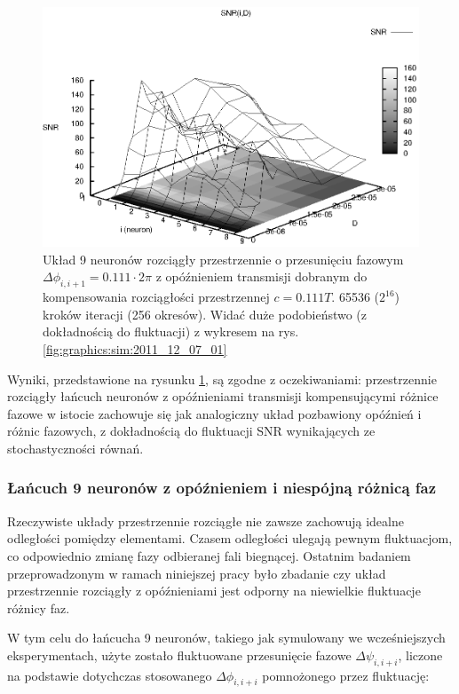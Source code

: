   \begin{figure}
    \includegraphics[width=140mm]{images/9neuron/2011_12_07_04}
    \caption{Układ 9 neuronów rozciągły przestrzennie o przesunięciu fazowym $\Delta \phi_{i,i+1} = 0.111 \cdot 2 \pi$ z opóźnieniem transmisji dobranym do kompensowania rozciągłości przestrzennej $c = 0.111 T$. 65536 ($2^{16}$) kroków iteracji (256 okresów). Widać duże podobieństwo (z dokładnością do fluktuacji) z wykresem na rys. \ref{fig:graphics:sim:2011_12_07_01}}
    \label{fig:graphics:sim:2010_12_07_04}
  \end{figure}

  Wyniki, przedstawione na rysunku \ref{fig:graphics:sim:2010_12_07_04}, są zgodne z oczekiwaniami: przestrzennie rozciągły łańcuch neuronów z opóźnieniami transmisji kompensującymi różnice fazowe w istocie zachowuje się jak analogiczny układ pozbawiony opóźnień i różnic fazowych, z dokładnością do fluktuacji SNR wynikających ze stochastyczności równań.

  \subsubsection{Łańcuch 9 neuronów z opóźnieniem i niespójną różnicą faz}

  Rzeczywiste układy przestrzennie rozciągłe nie zawsze zachowują idealne odległości pomiędzy elementami. Czasem odległości ulegają pewnym fluktuacjom, co odpowiednio zmianę fazy odbieranej fali biegnącej.
  Ostatnim badaniem przeprowadzonym w ramach niniejszej pracy było zbadanie czy układ przestrzennie rozciągły z opóźnieniami jest odporny na niewielkie fluktuacje różnicy faz.

  W tym celu do łańcucha 9 neuronów, takiego jak symulowany we wcześniejszych eksperymentach, użyte zostało fluktuowane przesunięcie fazowe $\Delta \psi_{i,i+i}$, liczone na podstawie dotychczas stosowanego $\Delta \phi_{i,i+i}$ pomnożonego przez fluktuację:

